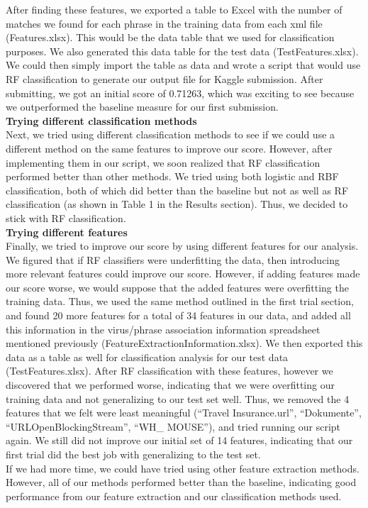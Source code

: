 \documentclass[submit]{harvardml}
\begin{document}
After finding these features, we exported a table to Excel with the number of matches we found for each phrase in the training data from each xml file (Features.xlsx). This would be the data table that we used for classification purposes. We also generated this data table for the test data (TestFeatures.xlsx). We could then simply import the table as data and wrote a script that would use RF classification to generate our output file for Kaggle submission. After submitting, we got an initial score of 0.71263, which was exciting to see because we outperformed the baseline measure for our first submission. \\

\noindent \textbf{Trying different classification methods} \\

Next, we tried using different classification methods to see if we could use a different method on the same features to improve our score. However, after implementing them in our script, we soon realized that RF classification performed better than other methods. We tried using both logistic and RBF classification, both of which did better than the baseline but not as well as RF classification (as shown in Table 1 in the Results section). Thus, we decided to stick with RF classification. \\

\noindent \textbf{Trying different features} \\

Finally, we tried to improve our score by using different features for our analysis. We figured that if RF classifiers were underfitting the data, then introducing more relevant features could improve our score. However, if adding features made our score worse, we would suppose that the added features were overfitting the training data. Thus, we used the same method outlined in the first trial section, and found 20 more features for a total of 34 features in our data, and added all this information in the virus/phrase association information spreadsheet mentioned previously (FeatureExtractionInformation.xlsx). We then exported this data as a table as well for classification analysis for our test data (TestFeatures.xlsx). After RF classification with these features, however we discovered that we performed worse, indicating that we were overfitting our training data and not generalizing to our test set well. Thus, we removed the 4 features that we felt were least meaningful (``Travel Insurance.url'', ``Dokumente'', ``URLOpenBlockingStream'', ``WH\_ MOUSE''), and tried running our script again. We still did not improve our initial set of 14 features, indicating that our first trial did the best job with generalizing to the test set. \\

If we had more time, we could have tried using other feature extraction methods. However, all of our methods performed better than the baseline, indicating good performance from our feature extraction and our classification methods used.
\end{document}

